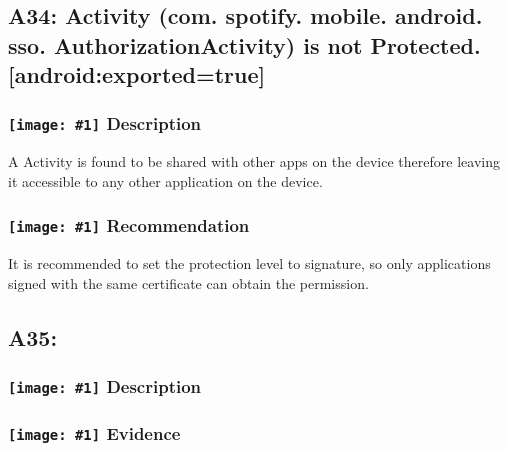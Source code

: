 \documentclass[12p]{article}
\newcommand{\icon}[1]{\texttt{[image: \#1]}}
\begin{document}
\subsection{A34: Activity (com. spotify. mobile. android. sso. AuthorizationActivity) is not Protected. [android:exported=true]}
\subsubsection*{\protect\icon{/home/miki/Documents/GITHUB/AndroidPermissions/python/vulns/report_icons/basic_sheet.png} Description}
A Activity is found to be shared with other apps on the device therefore leaving it accessible to any other application on the device.
\subsubsection*{\protect\icon{/home/miki/Documents/GITHUB/AndroidPermissions/python/vulns/report_icons/basic_todo.png} Recommendation}
It is recommended to set the protection level to signature, so only applications signed with the same certificate can obtain the permission.
\subsection{A35: }
\subsubsection*{\protect\icon{/home/miki/Documents/GITHUB/AndroidPermissions/python/vulns/report_icons/basic_sheet.png} Description}

\subsubsection*{\protect\icon{/home/miki/Documents/GITHUB/AndroidPermissions/python/vulns/report_icons/basic_magnifier.png} Evidence}



\end{document}
